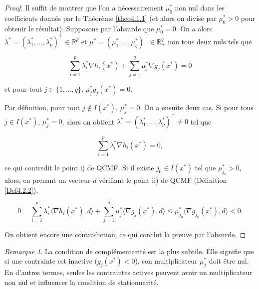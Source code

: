 \documentclass[a4paper,12pt,openany]{book}
\theoremstyle{plain}
\theoremstyle{definition}
\theoremstyle{remark}
\newtheorem{remark}[theorem]{Remarque}
\theoremstyle{nbstyle}
\begin{document}
	\begin{proof}
		Il suffit de montrer que l’on a nécessairement \(\mu^*_0\) non nul dans les coefficients donnés par le Théorème \ref{theo4.1.1} (et alors on divise par \(\mu^*_0 > 0\) pour obtenir le résultat). Supposons par l’absurde que \(\mu^*_0 = 0\). On a alors \(\lambda^* = (\lambda^*_1, \ldots, \lambda^*_p)^\top \in \mathbb{R}^p\) et \(\mu^* = (\mu^*_1, \ldots, \mu^*_q)^\top \in \mathbb{R}^q_+\) non tous deux nuls tels que
		
		\[
		\sum_{i=1}^p \lambda^*_i \nabla h_i(x^*) + \sum_{j=1}^q \mu^*_j \nabla g_j(x^*) = 0
		\]
		
		et pour tout \(j \in \{1, \ldots, q\}\), \(\mu^*_j g_j(x^*) = 0\).
		
		Par définition, pour tout \(j \notin I(x^*)\), \(\mu^*_j = 0\). On a ensuite deux cas. Si pour tous \(j \in I(x^*)\), \(\mu^*_j = 0\), alors on obtient \(\lambda^* = (\lambda^*_1, \ldots, \lambda^*_p)^\top \neq 0\) tel que
		
		\[
		\sum_{i=1}^p \lambda^*_i \nabla h_i(x^*) = 0,
		\]
		
		ce qui contredit le point i) de QCMF. Si il existe \(j_0 \in I(x^*)\) tel que \(\mu^*_{j_0} > 0\), alors, en prenant un vecteur \(d\) vérifiant le point ii) de QCMF (Définition \ref{Def4.2.2}),
		
		\[
		0 = \sum_{i=1}^p \lambda^*_i \langle \nabla h_i(x^*), d \rangle + \sum_{j=1}^q \mu^*_j \langle \nabla g_j(x^*), d \rangle \leq \mu^*_{j_0} \langle \nabla g_{j_0}(x^*), d \rangle < 0.
		\]
		
		On obtient encore une contradiction, ce qui conclut la preuve par l’absurde.
	\end{proof}
	
	\begin{remark}
		La condition de complémentarité est la plus subtile. Elle signifie que si une contrainte est inactive ($g_j(x^*) < 0$), son multiplicateur $\mu_j^*$ doit être nul. En d'autres termes, seules les contraintes actives peuvent avoir un multiplicateur non nul et influencer la condition de stationnarité.
	\end{remark}
	
\end{document}
